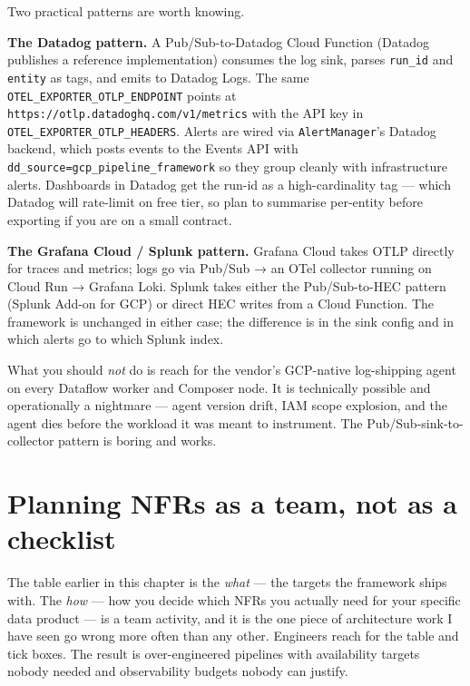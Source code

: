 \documentclass[
  11pt,
  british,
  oneside]{book}
\begin{document}
Two practical patterns are worth knowing.

\textbf{The Datadog pattern.} A Pub/Sub-to-Datadog Cloud Function
(Datadog publishes a reference implementation) consumes the log sink,
parses \texttt{run\_id} and \texttt{entity} as tags, and emits to
Datadog Logs. The same \texttt{OTEL\_EXPORTER\_OTLP\_ENDPOINT} points at
\texttt{https://otlp.datadoghq.com/v1/metrics} with the API key in
\texttt{OTEL\_EXPORTER\_OTLP\_HEADERS}. Alerts are wired via
\texttt{AlertManager}'s Datadog backend, which posts events to the
Events API with \texttt{dd\_source=gcp\_pipeline\_framework} so they
group cleanly with infrastructure alerts. Dashboards in Datadog get the
run-id as a high-cardinality tag --- which Datadog will rate-limit on
free tier, so plan to summarise per-entity before exporting if you are
on a small contract.

\textbf{The Grafana Cloud / Splunk pattern.} Grafana Cloud takes OTLP
directly for traces and metrics; logs go via Pub/Sub → an OTel collector
running on Cloud Run → Grafana Loki. Splunk takes either the
Pub/Sub-to-HEC pattern (Splunk Add-on for GCP) or direct HEC writes from
a Cloud Function. The framework is unchanged in either case; the
difference is in the sink config and in which alerts go to which Splunk
index.

What you should \emph{not} do is reach for the vendor's GCP-native
log-shipping agent on every Dataflow worker and Composer node. It is
technically possible and operationally a nightmare --- agent version
drift, IAM scope explosion, and the agent dies before the workload it
was meant to instrument. The Pub/Sub-sink-to-collector pattern is boring
and works.

\hypertarget{planning-nfrs-as-a-team-not-as-a-checklist}{%
\section{Planning NFRs as a team, not as a
checklist}\label{planning-nfrs-as-a-team-not-as-a-checklist}}

The table earlier in this chapter is the \emph{what} --- the targets the
framework ships with. The \emph{how} --- how you decide which NFRs you
actually need for your specific data product --- is a team activity, and
it is the one piece of architecture work I have seen go wrong more often
than any other. Engineers reach for the table and tick boxes. The result
is over-engineered pipelines with availability targets nobody needed and
observability budgets nobody can justify.
\end{document}
